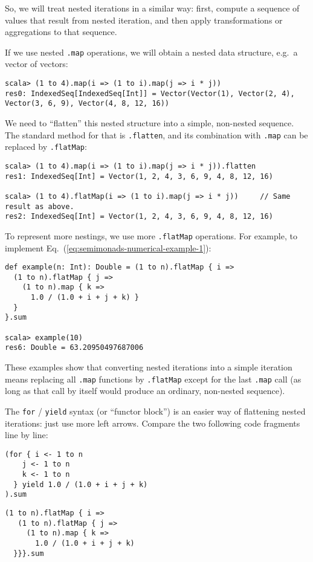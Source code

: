 So, we will treat nested iterations in a similar way: first, compute
a sequence of values that result from nested iteration, and then apply
transformations or aggregations to that sequence.

If we use nested \lstinline!.map! operations, we will obtain a nested
data structure, e.g.~a vector of vectors:
\begin{lstlisting}
scala> (1 to 4).map(i => (1 to i).map(j => i * j))
res0: IndexedSeq[IndexedSeq[Int]] = Vector(Vector(1), Vector(2, 4), Vector(3, 6, 9), Vector(4, 8, 12, 16))
\end{lstlisting}
We need to ``flatten'' this nested structure into a simple, non-nested
sequence. The standard method for that is \lstinline!.flatten!, and
its combination with \lstinline!.map! can be replaced by \lstinline!.flatMap!:
\begin{lstlisting}
scala> (1 to 4).map(i => (1 to i).map(j => i * j)).flatten
res1: IndexedSeq[Int] = Vector(1, 2, 4, 3, 6, 9, 4, 8, 12, 16)

scala> (1 to 4).flatMap(i => (1 to i).map(j => i * j))     // Same result as above.
res2: IndexedSeq[Int] = Vector(1, 2, 4, 3, 6, 9, 4, 8, 12, 16)
\end{lstlisting}
To represent more nestings, we use more \lstinline!.flatMap! operations.
For example, to implement Eq.~(\ref{eq:semimonads-numerical-example-1}):
\begin{lstlisting}
def example(n: Int): Double = (1 to n).flatMap { i =>
  (1 to n).flatMap { j =>
    (1 to n).map { k => 
      1.0 / (1.0 + i + j + k) }
  }
}.sum

scala> example(10)
res6: Double = 63.20950497687006
\end{lstlisting}
These examples show that converting nested iterations into a simple
iteration means replacing all \lstinline!.map! functions by \lstinline!.flatMap!
except for the last \lstinline!.map! call (as long as that call by
itself would produce an ordinary, non-nested sequence).

The \lstinline!for! / \lstinline!yield! syntax (or ``functor block'')
is an easier way of flattening nested iterations: just use more left
arrows. Compare the two following code fragments line by line:

\noindent \texttt{\textcolor{blue}{\footnotesize{}}}%
\begin{minipage}[c]{0.475\columnwidth}%
\texttt{\textcolor{blue}{\footnotesize{}}}
\begin{lstlisting}
(for { i <- 1 to n
    j <- 1 to n
    k <- 1 to n
  } yield 1.0 / (1.0 + i + j + k)
).sum
\end{lstlisting}
%
\end{minipage}\texttt{\textcolor{blue}{\footnotesize{}\hspace*{\fill}}}%
\begin{minipage}[c]{0.475\columnwidth}%
\texttt{\textcolor{blue}{\footnotesize{}}}
\begin{lstlisting}
(1 to n).flatMap { i =>
   (1 to n).flatMap { j =>
     (1 to n).map { k =>
       1.0 / (1.0 + i + j + k)
  }}}.sum
\end{lstlisting}
%
\end{minipage}{\footnotesize\par}

